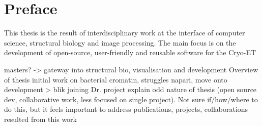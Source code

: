 \chapter{Preface}

This thesis is the result of interdisciplinary work at the interface of computer science, structural biology and image processing. The main focus is on the development of open-source, user-friendly and reusable software for the Cryo-ET

\begin{outline}
\1 masters? -> gateway into structural bio, visualisation and development
\1 Overview of thesis
    \2 initial work on bacterial cromatin, struggles
    \2 napari, move onto development > blik
    \2 joining Dr. project
\1 explain odd nature of thesis (open source dev, collaborative work, less focused on single project). Not sure if/how/where to do this, but it feels important to address
\1 publications, projects, collaborations resulted from this work
\end{outline}
